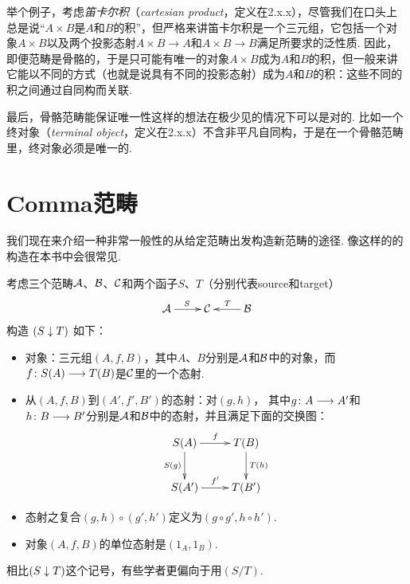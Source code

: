     举个例子，考虑\emph{笛卡尔积}（\emph{cartesian product}，定义在2.x.x），尽管我们在口头上总是说``$A\times B$是$A$和$B$的积''，但严格来讲笛卡尔积是一个三元组，它包括一个对象$A\times B$以及两个投影态射$A\times B\to A$和$A\times B\to B$满足所要求的泛性质. 因此，即便范畴是骨骼的，于是只可能有唯一的对象$A\times B$成为$A$和$B$的积，但一般来讲它能以不同的方式（也就是说具有不同的投影态射）成为$A$和$B$的积：这些不同的积之间通过自同构而关联.

    最后，骨骼范畴能保证唯一性这样的想法在极少见的情况下可以是对的. 比如一个终对象（\emph{terminal object}，定义在2.x.x）不含非平凡自同构，于是在一个骨骼范畴里，终对象必须是唯一的.

\section{Comma范畴}
  我们现在来介绍一种非常一般性的从给定范畴出发构造新范畴的途径. 像这样的的构造在本书中会很常见.

  \begin{defn}
    考虑三个范畴${\cal A}$、${\cal B}$、${\cal C}$和两个函子$S$、$T$（分别代表source和target）
          \begin{displaymath}
            \xymatrix{
               \Aa\ar[r]^{S} & \Cc & \Bb\ar[l]_{T}                }
          \end{displaymath}
    构造 $(S\downarrow T)$ 如下：
    \begin{itemize}
      \item 对象：三元组$(A,f,B)$，其中$A$、$B$分别是${\cal A}$和${\cal B}$中的对象，而$f\colon S(A)\longrightarrow T(B)$是${\cal C}$里的一个态射.
      \item 从$(A,f,B)$到$(A',f',B')$的态射：对$(g,h)$，
                 其中$g\colon A\longrightarrow A'$和$h\colon B\longrightarrow B'$分别是${\cal A}$和${\cal B}$中的态射，并且满足下面的交换图：
                 \begin{displaymath}
                   \xymatrix{
                       S(A)\ar[d]_{S(g)}\ar[r]^{f} & T(B)\ar[d]^{T(h)}  \\
                       S(A')\ar[r]^{f'} & T(B')           }
                 \end{displaymath}
      \item 态射之复合$(g,h)\circ(g',h')$定义为$(g\circ g',h\circ h')$.
      \item 对象$(A,f,B)$的单位态射是$(1_{A},1_{B})$.
    \end{itemize}
  \end{defn}
  \begin{rem}
    相比$(S\downarrow T)$这个记号，有些学者更偏向于用$(S/T)$.
  \end{rem}

